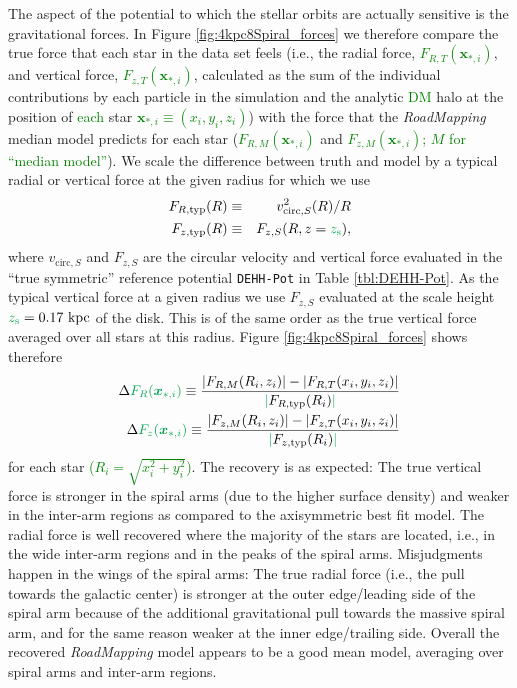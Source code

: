 \documentclass[iop,revtex4,numberedappendix,appendixfloats]{emulateapj}
\newcommand{\vect}[1]{\boldsymbol{#1}}
\newcommand{\RM}{{\sl RoadMapping}}
\newcommand{\NEW}[1]{\textcolor{Green}{#1}}
\newcommand{\OLD}[1]{}
\begin{document}
The aspect of the potential to which the stellar orbits are actually sensitive is the gravitational forces. In Figure \ref{fig:4kpc8Spiral_forces} we therefore compare the true force that each star in the data set feels (i.e., the radial force, \OLD{$F_{R,T}(*_i)$}\NEW{$F_{R,T}(\vect{x}_{*,i})$}, and vertical force, \OLD{$F_{T,M}(*_i)$}\NEW{$F_{z,T}(\vect{x}_{*,i})$}, calculated as the sum of the individual contributions by each particle in the simulation and the analytic \OLD{dark matter}\NEW{DM} halo at the position of \NEW{each} star \OLD{$*_i$}\NEW{$\vect{x}_{*,i}\equiv (x_i,y_i,z_i)$}) with the force that the \RM{} median model predicts for each star (\OLD{$F_{R,M}(*_i)$}\NEW{$F_{R,M}(\vect{x}_{*,i})$} and \OLD{$F_{z,M}(*_i)$}\NEW{$F_{z,M}(\vect{x}_{*,i})$; $M$ for ``median model''}). We scale the difference between truth and model by a typical radial or vertical force at the given radius for which we use
\begin{eqnarray}
F_{R,\text{typ}}(R) &\equiv& v^2_{\text{circ},S}(R) / R\label{eq:FRtyp}\\
F_{z,\text{typ}}(R) &\equiv& F_{z,S}(R,z=\OLD{h_z}\NEW{z_\text{s}}),
\end{eqnarray}
where $v_{\text{circ},S}$ and $F_{z,S}$ are the circular velocity and vertical force evaluated in the ``true symmetric'' reference potential \texttt{DEHH-Pot} in Table \ref{tbl:DEHH-Pot}. As the typical vertical force at a given radius we use $F_{z,S}$ evaluated at the scale height $\OLD{h_z}\NEW{z_\text{s}}=0.17~\text{kpc}$ of the disk. This is of the same order as the true vertical force averaged over all stars at this radius. Figure \ref{fig:4kpc8Spiral_forces} shows therefore
\begin{eqnarray}
\Delta \OLD{F_R(*_i)}\NEW{F_R(\vect{x}_{*,i})} \equiv \frac{|F_{R,M}(R_i,z_i)| - |F_{R,T}(x_i,y_i,z_i)|}{\NEW{|}F_{R,\text{typ}}(R_i)\NEW{|}}\label{eq:delta_FR}\\
\Delta \OLD{F_z(*_i)}\NEW{F_z(\vect{x}_{*,i})} \equiv \frac{|F_{z,M}(R_i,z_i)| - |F_{z,T}(x_i,y_i,z_i)|}{\NEW{|}F_{z,\text{typ}}(R_i)\NEW{|}}\label{eq:delta_Fz}
\end{eqnarray}
for each star \NEW{($R_i = \sqrt{x_i^2+y_i^2}$)}. The recovery is as expected: The true vertical force is stronger in the spiral arms (due to the higher surface density) and weaker in the inter-arm regions as compared to the axisymmetric best fit model. The radial force is well recovered where the majority of the stars are located, i.e., in the wide inter-arm regions and in the peaks of the spiral arms. Misjudgments happen in the wings of the spiral arms: The true radial force (i.e., the pull towards the galactic center) is stronger at the outer edge/leading side of the spiral arm because of the additional gravitational pull towards the massive spiral arm, and for the same reason weaker at the inner edge/trailing side. Overall the recovered \RM{} model appears to be a good mean model, averaging over spiral arms and inter-arm regions.
\end{document}
